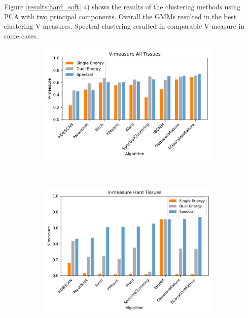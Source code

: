 \documentclass[a4paper,11pt]{article}
\begin{document}
Figure \ref{results:hard_soft} a) shows the results of the clustering methods using PCA with two principal components. Overall the GMMs resulted in the best clustering V-measures. Spectral clustering resulted in comparable V-measure in some cases.

\begin{figure}[b!]
    \centering
    \begin{subfigure}[b]{0.32\textwidth}
        \includegraphics[width=\textwidth]{figures/energy_comparison.png}
    \end{subfigure}
    ~ %
    \begin{subfigure}[b]{0.32\textwidth}
        \includegraphics[width=\textwidth]{figures/hard.png}

\end{subfigure}
\end{figure}
\end{document}
